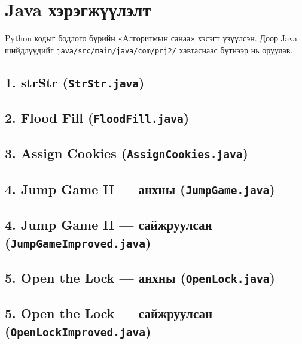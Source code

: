 \documentclass[11pt,a4paper]{article}
\renewcommand{\_}{\oldunderscore\allowbreak}
\begin{document}
\appendix
\clearpage
\section{Java хэрэгжүүлэлт}
Python кодыг бодлого бүрийн «Алгоритмын санаа» хэсэгт үзүүлсэн. Доор Java шийдлүүдийг \texttt{java/\allowbreak{}src/\allowbreak{}main/\allowbreak{}java/\allowbreak{}com/\allowbreak{}prj2/} хавтаснаас бүтнээр нь оруулав.

\subsection{1. strStr (\texttt{StrStr.java})}

\subsection{2. Flood Fill (\texttt{FloodFill.java})}

\subsection{3. Assign Cookies (\texttt{AssignCookies.java})}

\subsection{4. Jump Game II — анхны (\texttt{JumpGame.java})}

\subsection{4. Jump Game II — сайжруулсан (\texttt{JumpGameImproved.java})}

\subsection{5. Open the Lock — анхны (\texttt{OpenLock.java})}

\subsection{5. Open the Lock — сайжруулсан (\texttt{OpenLockImproved.java})}
\end{document}
